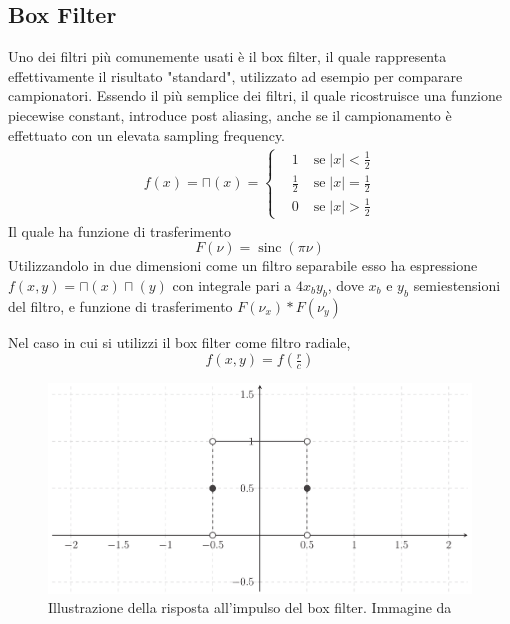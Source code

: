 \subsection{Box Filter}\label{chapter5:reconstruction:boxFilter}
Uno dei filtri pi\`u comunemente usati \`e il box filter, il quale rappresenta effettivamente il risultato "standard", utilizzato ad esempio per 
comparare campionatori. Essendo il pi\`u semplice dei filtri, il quale ricostruisce una funzione piecewise constant, introduce post aliasing, anche 
se il campionamento \`e effettuato con un elevata sampling frequency.
\begin{align}
	f(x)=\sqcap(x)=\left\{\begin{aligned}
		&1 &\mathrm{se}\;|x|<\tfrac{1}{2}\\
		&\tfrac{1}{2}\;&\mathrm{se}\;|x|=\tfrac{1}{2}\\
		&0 &\mathrm{se}\;|x|>\tfrac{1}{2}
	\end{aligned}\right.
\end{align}
Il quale ha funzione di trasferimento
\begin{equation}
	F(\nu)=\operatorname{sinc}(\pi\nu)
\end{equation}
Utilizzandolo in due dimensioni come un filtro separabile esso ha espressione \mbox{$f(x,y)=\sqcap(x)\sqcap(y)$} con 
integrale pari a $4x_by_b$, dove $x_b$ e $y_b$ semiestensioni del filtro, e funzione di trasferimento
\mbox{$F(\nu_x)*F(\nu_y)$}\par
Nel caso in cui si utilizzi il box filter come filtro radiale, 
\begin{equation}
	f(x,y)=f\left(\tfrac{r}{c}\right)
\end{equation}
\begin{figure}[tb]
	\centering 
	\includegraphics[width=0.8\linewidth]{../assets/chapter5_reconstruction_box.png}
	\caption{Illustrazione della risposta all'impulso del box filter. Immagine da \cite{pegoraro}}
	\label{chapter5:reconstruction:boxFilter}
\end{figure}
